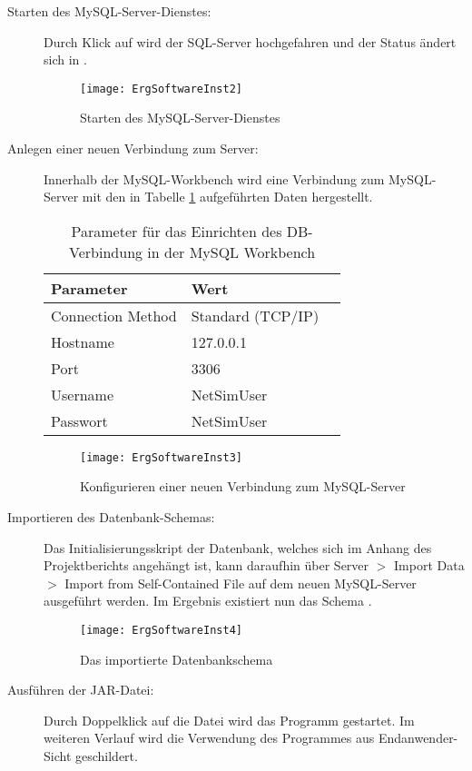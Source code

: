\begin{description}
\item [Starten des MySQL-Server-Dienstes:]
Durch Klick auf  wird der SQL-Server hochgefahren und der Status ändert sich in .
\begin{figure}[ht]
	\centering
	\texttt{[image: ErgSoftwareInst2]}
	\caption{Starten des MySQL-Server-Dienstes}
	\label{fig:ErgSoftwareInst2}
\end{figure}
\item [Anlegen einer neuen Verbindung zum Server:]
Innerhalb der MySQL-Workbench wird eine Verbindung zum MySQL-Server mit den in Tabelle \ref{tab:mysql} aufgeführten Daten hergestellt.
\begin{table}[ht]
\centering
	 \begin{tabular}{|l|l|l|}
	 \hline
	Parameter & Wert\\
	\hline
	\hline
	Connection Method & Standard (TCP/IP)\\
	 \hline
	Hostname & 127.0.0.1\\
	 \hline
	Port & 3306\\
	 \hline
	Username & NetSimUser\\
	 \hline
	Passwort & NetSimUser\\
	 \hline
	 \end{tabular}
\caption{Parameter für das Einrichten des DB-Verbindung in der MySQL Workbench}
\label{tab:mysql}
\end{table}
\begin{figure}[ht]
	\centering
	\texttt{[image: ErgSoftwareInst3]}
	\caption{Konfigurieren einer neuen Verbindung zum MySQL-Server}
	\label{fig:ErgSoftwareInst3}
\end{figure}
\item [Importieren des Datenbank-Schemas:] Das Initialisierungsskript der Datenbank, welches sich im Anhang des Projektberichts angehängt ist, kann daraufhin über Server $ > $ Import Data $ > $ Import from Self-Contained File auf dem neuen MySQL-Server ausgeführt werden. Im Ergebnis existiert nun das Schema .
\begin{figure}[ht]
	\centering
	\texttt{[image: ErgSoftwareInst4]}
	\caption{Das importierte Datenbankschema }
	\label{fig:ErgSoftwareInst4}
\end{figure}
\item [Ausführen der JAR-Datei:] Durch Doppelklick auf die Datei  wird das Programm gestartet. Im weiteren Verlauf wird die Verwendung des Programmes aus Endanwender-Sicht geschildert.
\end{description}

